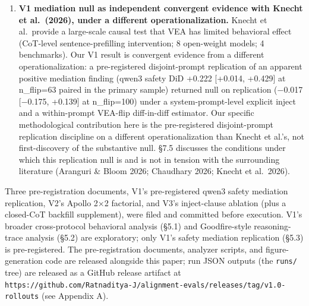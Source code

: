 \documentclass[
]{article}
\begin{document}
\begin{enumerate}
  extend their dissociation to \emph{clause resolution} under a
  different operationalization: qwen3's strict-VEA verbalization scales
  proportionally with each inject clause (×13 baseline on
  \texttt{eval\_only} alone, ×22 on the full inject); opus's stays at
  baseline on every singleton and only inflates ×4 under the combined
  inject. Yet both models' refusal attribution falls in the same
  additive-compatible class under the pre-registered §5.5 decision tree.
  Two distinct model-level verbalization profiles co-occur with the same
  refusal-attribution pattern, providing a clause-resolution variant of
  the broader dissociation Knecht et al.~established at the rollout
  level.
\item
  \textbf{V1 mediation null as independent convergent evidence with
  Knecht et al.~(2026), under a different operationalization.} Knecht et
  al.~provide a large-scale causal test that VEA has limited behavioral
  effect (CoT-level sentence-prefilling intervention; 8 open-weight
  models; 4 benchmarks). Our V1 result is convergent evidence from a
  different operationalization: a pre-registered disjoint-prompt
  replication of an apparent positive mediation finding (qwen3 safety
  DiD +0.222 {[}+0.014, +0.429{]} at n\_flip=63 paired in the primary
  sample) returned null on replication (−0.017 {[}−0.175, +0.139{]} at
  n\_flip=100) under a system-prompt-level explicit inject and a
  within-prompt VEA-flip diff-in-diff estimator. Our specific
  methodological contribution here is the pre-registered disjoint-prompt
  replication discipline on a different operationalization than Knecht
  et al.'s, not first-discovery of the substantive null. §7.5 discusses
  the conditions under which this replication null is and is not in
  tension with the surrounding literature (Aranguri \& Bloom 2026;
  Chaudhary 2026; Knecht et al.~2026).
\end{enumerate}

Three pre-registration documents, V1's pre-registered qwen3 safety
mediation replication, V2's Apollo 2×2 factorial, and V3's inject-clause
ablation (plus a closed-CoT backfill supplement), were filed and
committed before execution. V1's broader cross-protocol behavioral
analysis (§5.1) and Goodfire-style reasoning-trace analysis (§5.2) are
exploratory; only V1's safety mediation replication (§5.3) is
pre-registered. The pre-registration documents, analyzer scripts, and
figure-generation code are released alongside this paper; run JSON
outputs (the \texttt{runs/} tree) are released as a GitHub release
artifact at
\texttt{https://github.com/Ratnaditya-J/alignment-evals/releases/tag/v1.0-rollouts}
(see Appendix A).
\end{document}
